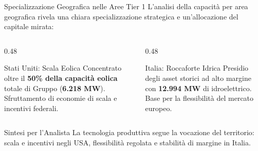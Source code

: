\begin{frame}{Specializzazione Geografica nelle Aree Tier 1}
    L'analisi della capacità per area geografica rivela una chiara specializzazione strategica e un'allocazione del capitale mirata:
    \vspace{0.2cm}

    \begin{columns}[T]
        \begin{column}{0.48\textwidth}
            \begin{block}{Stati Uniti: Scala Eolica}
                Concentrato oltre il \textbf{50\% della capacità eolica} totale di Gruppo (\textbf{6.218 MW}). Sfruttamento di economie di scala e incentivi federali.
            \end{block}
        \end{column}
        \pause
        
        \begin{column}{0.48\textwidth}
            \begin{block}{Italia: Roccaforte Idrica}
                Presidio degli asset storici ad alto margine con \textbf{12.994 MW} di idroelettrico. Base per la flessibilità del mercato europeo.
            \end{block}
        \end{column}
    \end{columns}
    \vspace{0.3cm}
    \pause
    
    \begin{alertblock}{Sintesi per l'Analista}
        La tecnologia produttiva segue la vocazione del territorio: scala e incentivi negli USA, flessibilità regolata e stabilità di margine in Italia.
    \end{alertblock}
\end{frame}
